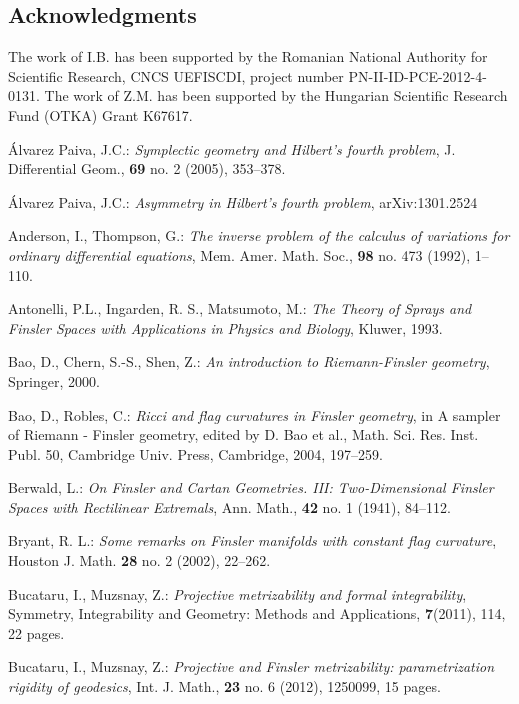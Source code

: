 \documentclass[oneside,english]{amsart}
\numberwithin{equation}{section}
\numberwithin{figure}{section}
\theoremstyle{plain}
\theoremstyle{plain}
\theoremstyle{definition}
\theoremstyle{plain}
\theoremstyle{plain}
\theoremstyle{plain}
\theoremstyle{remark}
\theoremstyle{remark}
\begin{document}
 \subsection*{Acknowledgments} The work of I.B. has been supported by the
 Romanian National Authority for Scientific Research,
 CNCS UEFISCDI, project number
 PN-II-ID-PCE-2012-4-0131. The work of
 Z.M. has been supported by the Hungarian Scientific Research Fund (OTKA) Grant K67617.

\begin{thebibliography}{99}

 \'Alvarez Paiva, J.C.: \emph{Symplectic geometry and
    Hilbert's fourth problem}, J. Differential Geom., \textbf{69}
  no. 2 (2005), 353--378.

 \'Alvarez Paiva, J.C.: \emph{Asymmetry in
    Hilbert's fourth problem}, arXiv:1301.2524

 Anderson, I., Thompson, G.: \emph{The inverse problem
    of the calculus of variations for ordinary differential
    equations}, Mem. Amer. Math. Soc., \textbf{98} no. 473
  (1992), 1--110.

 Antonelli, P.L., Ingarden, R. S., Matsumoto, M.:
  \emph{The Theory of Sprays and Finsler Spaces with Applications in
    Physics and Biology}, Kluwer, 1993.

 Bao, D., Chern, S.-S., Shen, Z.: \emph{An introduction
    to Riemann-Finsler geometry}, Springer, 2000.

 Bao, D., Robles, C.: \emph{Ricci and flag curvatures in
    Finsler geometry}, in A sampler of Riemann - Finsler geometry,
  edited by D. Bao et al., Math. Sci. Res. Inst. Publ. 50, Cambridge
  Univ. Press, Cambridge, 2004, 197--259.

 Berwald, L.: \emph{On Finsler and
    Cartan Geometries. III: Two-Dimensional Finsler Spaces with
    Rectilinear Extremals}, Ann.  Math., \textbf{42} no. 1 (1941), 84--112.

 Bryant, R. L.: \emph{Some remarks on Finsler
    manifolds with constant flag curvature}, Houston
  J. Math. \textbf{28} no. 2 (2002), 22--262.


 Bucataru, I., Muzsnay, Z.: \emph{Projective
    metrizability and formal integrability}, Symmetry, Integrability
  and Geometry: Methods and Applications, \textbf{7}(2011), 114, 22
  pages.

 Bucataru, I., Muzsnay, Z.: \emph{Projective and Finsler
    metrizability: parametrization rigidity of geodesics},
  Int. J. Math., \textbf{23} no. 6 (2012), 1250099, 15 pages.


\end{thebibliography}
\end{document}

